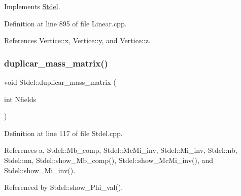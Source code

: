 Implements \hyperlink{classStdel_a92e13b000249ba73b35407d925cbd7a8}{Stdel}.



Definition at line 895 of file Linear.\+cpp.



References Vertice\+::x, Vertice\+::y, and Vertice\+::z.

\mbox{\label{classStdel_a922b779be1f8f12b7a5535ab529bff64}} 
\subsubsection{\texorpdfstring{duplicar\+\_\+mass\+\_\+matrix()}{duplicar\_mass\_matrix()}}
{\footnotesize\ttfamily void Stdel\+::duplicar\+\_\+mass\+\_\+matrix (\begin{DoxyParamCaption}\item[{int}]{Nfields }\end{DoxyParamCaption})\hspace{0.3cm}{\ttfamily [inherited]}}



Definition at line 117 of file Stdel.\+cpp.



References a, Stdel\+::\+Mb\+\_\+comp, Stdel\+::\+Mc\+Mi\+\_\+inv, Stdel\+::\+Mi\+\_\+inv, Stdel\+::nb, Stdel\+::nn, Stdel\+::show\+\_\+\+Mb\+\_\+comp(), Stdel\+::show\+\_\+\+Mc\+Mi\+\_\+inv(), and Stdel\+::show\+\_\+\+Mi\+\_\+inv().



Referenced by Stdel\+::show\+\_\+\+Phi\+\_\+val().

